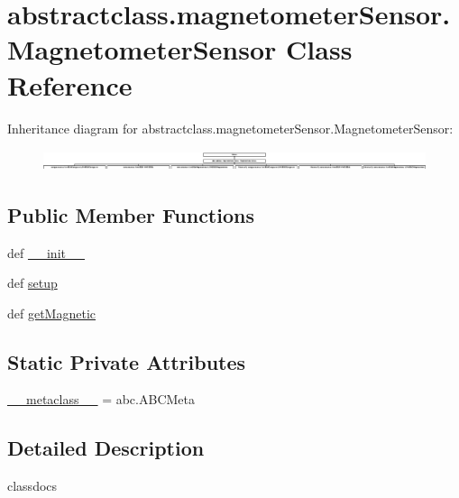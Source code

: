 \hypertarget{classabstractclass_1_1magnetometerSensor_1_1MagnetometerSensor}{}\section{abstractclass.\+magnetometer\+Sensor.\+Magnetometer\+Sensor Class Reference}
\label{classabstractclass_1_1magnetometerSensor_1_1MagnetometerSensor}
Inheritance diagram for abstractclass.\+magnetometer\+Sensor.\+Magnetometer\+Sensor\+:\begin{figure}[H]
\begin{center}
\leavevmode
\includegraphics[height=0.625000cm]{classabstractclass_1_1magnetometerSensor_1_1MagnetometerSensor}
\end{center}
\end{figure}
\subsection*{Public Member Functions}
\begin{DoxyCompactItemize}
\item 
def \hyperlink{classabstractclass_1_1magnetometerSensor_1_1MagnetometerSensor_a679faf17018b44abb7d939650c15f004}{\+\_\+\+\_\+init\+\_\+\+\_\+}
\item 
def \hyperlink{classabstractclass_1_1magnetometerSensor_1_1MagnetometerSensor_a6b279d4f3dc41adc060f31e050dc4123}{setup}
\item 
def \hyperlink{classabstractclass_1_1magnetometerSensor_1_1MagnetometerSensor_a7ce8c2d7e0ba48c9b0e18061916586d1}{get\+Magnetic}
\end{DoxyCompactItemize}
\subsection*{Static Private Attributes}
\begin{DoxyCompactItemize}
\item 
\hyperlink{classabstractclass_1_1magnetometerSensor_1_1MagnetometerSensor_a3c9647014542e9d1912848f0b8315dc7}{\+\_\+\+\_\+metaclass\+\_\+\+\_\+} = abc.\+A\+B\+C\+Meta
\end{DoxyCompactItemize}


\subsection{Detailed Description}
\begin{DoxyVerb}classdocs
\end{DoxyVerb}
 


